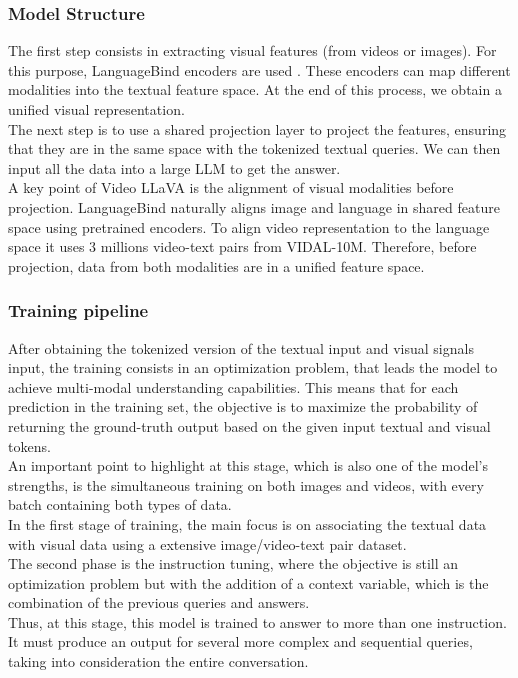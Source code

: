 \documentclass[10pt,twocolumn,letterpaper]{article}
\begin{document}
\subsubsection{Model Structure}
The first step consists in extracting visual features (from videos or images). For this purpose, LanguageBind encoders are used \cite{b9}. These encoders can map different modalities into the textual feature space. At the end of this process, we obtain a unified visual representation.\\ 
The next step is to use a shared projection layer to project the features, ensuring that they are in the same space with the tokenized textual queries. We can then input all the data into a large LLM to get the answer.\\
A key point of Video LLaVA is the alignment of visual modalities before projection. LanguageBind naturally aligns image and language in shared feature space using pretrained encoders. To align video representation to the language space it uses 3 millions video-text pairs from VIDAL-10M\cite{b9}. Therefore, before projection, data from both modalities are in a unified feature space.

\subsubsection{Training pipeline}
After obtaining the tokenized version of the textual input and visual signals input, the training consists in an optimization problem, that leads the model to achieve multi-modal understanding capabilities.
This means that for each prediction in the training set, the objective is to maximize the probability of returning the ground-truth output based on the given input textual and visual tokens. \\
An important point to highlight at this stage, which is also one of the model's strengths, is the simultaneous training on both images and videos, with every batch containing both types of data.\\
In the first stage of training, the main focus is on associating the textual data with visual data using a extensive image/video-text pair dataset.\\
The second phase is the instruction tuning, where the objective is still an optimization problem but with the addition of a context variable, which is the combination of the previous queries and answers.\\
Thus, at this stage, this model is trained to answer to more than one instruction. It must produce an output for several more complex and sequential queries, taking into consideration the entire conversation.
\end{document}
